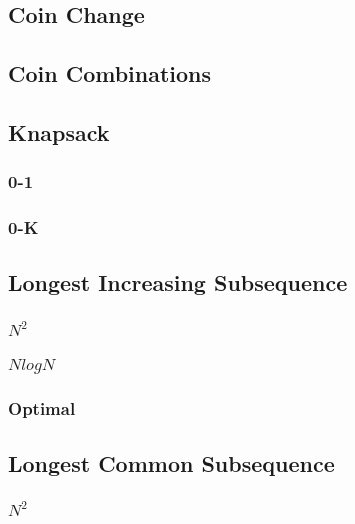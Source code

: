 \documentclass{article}
\begin{document}
\subsection{Coin Change}

\subsection{Coin Combinations}


\subsection{Knapsack}
\subsubsection{0-1}

\subsubsection{0-K}


\subsection{Longest Increasing Subsequence}
\subsubsection{\texorpdfstring{$N^{2}$}{}}

\subsubsection{\texorpdfstring{$N log N$}{}}

\subsubsection{Optimal}


\subsection{Longest Common Subsequence}
\subsubsection{\texorpdfstring{$N^{2}$}{}}

\end{document}
